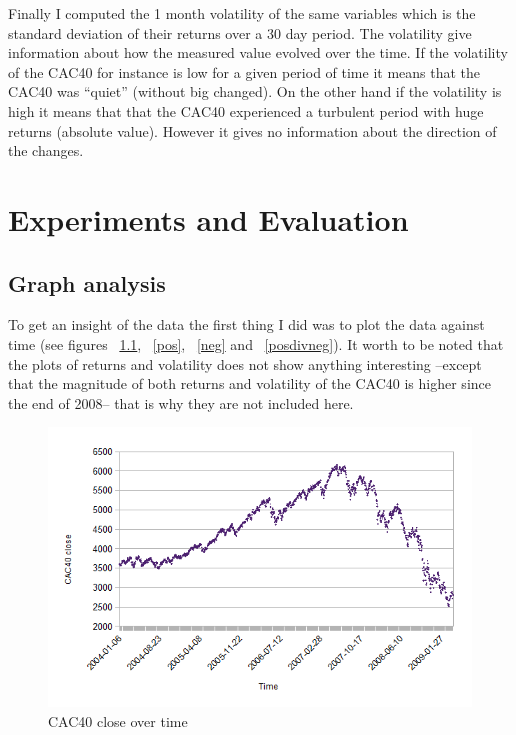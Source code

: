 \documentclass[12pt]{report}
\begin{document}
Finally I computed the 1 month volatility of the same variables which is the standard deviation of their returns over a 30 day period. The volatility give information about how the measured value evolved over the time. If the volatility of the CAC40 for instance is low for a given period of time it means that the CAC40 was ``quiet'' (without big changed). On the other hand if the volatility is high it means that that the CAC40 experienced a turbulent period with huge returns (absolute value). However it gives no information about the direction of the changes.

\chapter{Experiments and Evaluation}
\section{Graph analysis}

To get an insight of the data the first thing I did was to plot the data against time (see figures ~\ref{cac}, ~\ref{pos}, ~\ref{neg} and ~\ref{posdivneg}). It worth to be noted that the plots of returns and volatility does not show anything interesting --except that the magnitude of both returns and volatility of the CAC40 is higher since the end of 2008-- that is why they are not included here.

\begin{figure}[h!]
	\caption{CAC40 close over time\label{cac}}
	\includegraphics{plots/time/cac.png}
\end{figure}
\end{document}
